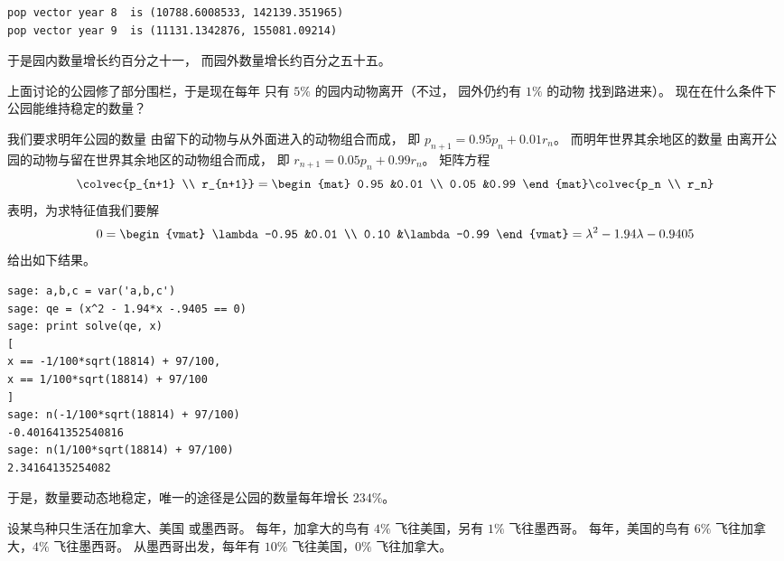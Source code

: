 \begin{exercises}
\begin{answer}
\begin{lstlisting}
pop vector year 8  is (10788.6008533, 142139.351965)
pop vector year 9  is (11131.1342876, 155081.09214)
\end{lstlisting}
       于是园内数量增长约百分之十一，
       而园外数量增长约百分之五十五。
    \end{answer}
  \item
    上面讨论的公园修了部分围栏，于是现在每年
    只有 $5\%$ 的园内动物离开（不过，
    园外仍约有 $1\%$ 的动物
    找到路进来）。
    现在在什么条件下公园能维持稳定的数量？
    \begin{answer}
      我们要求明年公园的数量
      由留下的动物与从外面进入的动物组合而成，
      即 $p_{n+1}=0.95p_n+0.01r_n$。
      而明年世界其余地区的数量
      由离开公园的动物与留在世界其余地区的动物组合而成，
      即 $r_{n+1}=0.05p_n+0.99r_n$。
      矩阵方程
      \begin{equation*}
        \colvec{p_{n+1}  \\ r_{n+1}}
        =
        \begin{mat}
          0.95  &0.01  \\
          0.05  &0.99
        \end{mat}
        \colvec{p_n  \\ r_n}
      \end{equation*}
      表明，为求特征值我们要解
      \begin{equation*}
        0
        =
        \begin{vmat}
          \lambda-0.95  &0.01  \\
          0.10          &\lambda-0.99
        \end{vmat}
        =\lambda^2-1.94\lambda-0.9405
      \end{equation*}
      \Sage{} 给出如下结果。
\begin{lstlisting}
sage: a,b,c = var('a,b,c')
sage: qe = (x^2 - 1.94*x -.9405 == 0)
sage: print solve(qe, x)
[
x == -1/100*sqrt(18814) + 97/100,
x == 1/100*sqrt(18814) + 97/100
]
sage: n(-1/100*sqrt(18814) + 97/100)
-0.401641352540816
sage: n(1/100*sqrt(18814) + 97/100)
2.34164135254082
\end{lstlisting}
      于是，数量要动态地稳定，唯一的途径是公园的数量每年增长 $234\%$。
    \end{answer}
  \item
    设某鸟种只生活在加拿大、美国
    或墨西哥。
    每年，加拿大的鸟有 $4\%$ 飞往美国，另有 $1\%$
    飞往墨西哥。
    每年，美国的鸟有 $6\%$ 飞往加拿大，$4\%$ 飞往墨西哥。
    从墨西哥出发，每年有 $10\%$ 飞往美国，$0\%$ 飞往加拿大。
    \begin{exparts}

\end{exparts}
\end{exercises}
